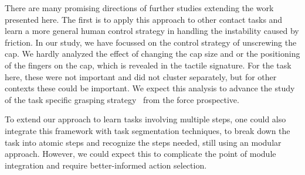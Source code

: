 There are many promising directions of further studies extending the
work presented here. The first is to apply this approach to other
contact tasks and learn a more general human control strategy in
handling the instability caused by friction.
In our study, we have focussed on the control strategy of unscrewing
the cap. We hardly analyzed the effect of changing the cap size and or
the positioning of the fingers on the cap, which is revealed in the
tactile signature. For the task here, these were not important and
did not cluster separately, but for other contexts these could be
important. We expect this analysis to advance the study of the task specific grasping
strategy~\citep{el2013generation,dang2014semantic} from the force prospective.

To extend our approach to learn tasks involving multiple steps, one
could also integrate this framework with task segmentation techniques,
to break down the task into atomic steps and recognize the steps
needed, still using an modular approach. However, we could expect this
to complicate the point of module integration and require
better-informed action selection. %


